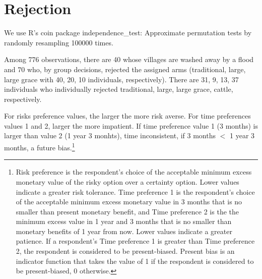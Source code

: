 \section{Rejection}
\label{AppSecRejection}
\setcounter{table}{0}
\setcounter{figure}{0}



We use \textsf{R}'s \textsf{coin} package \textsf{independence\_test}: Approximate permutation tests by randomly resampling 100000 times.

Among 776 observations, there are 40 whose villages are washed away by a flood and 70 who, by group decisions, rejected the assigned arms (traditional, large, large grace with 40, 20, 10 individuals, respectively). There are 31, 9, 13, 37 individuals who individually rejected traditional, large, large grace, cattle, respectively. %







For risks preference values, the larger the more risk averse. For time preferences values 1 and 2, larger the more impatient. If time preference value 1 (3 months) is larger than value 2 (1 year 3 monhts), time inconsistent, if 3 months $<$ 1 year 3 months, a future bias.\footnote{\textsf{Risk preference} is the respondent's choice of the acceptable minimum excess monetary value of the risky option over a certainty option. Lower values indicate a greater risk tolerance. \textsf{Time preference 1} is the respondent's choice of the acceptable minimum excess monetary value in 3 months that is no smaller than present monetary benefit, and \textsf{Time preference 2} is the the minimum excess value in 1 year and 3 months that is no smaller than monetary benefits of 1 year from now. Lower values indicate a greater patience. If a respondent's \textsf{Time preference 1} is greater than \textsf{Time preference 2}, the respondent is considered to be present-biased. \textsf{Present bias} is an indicator function that takes the value of 1 if the respondent is considered to be present-biased, 0 otherwise. }




